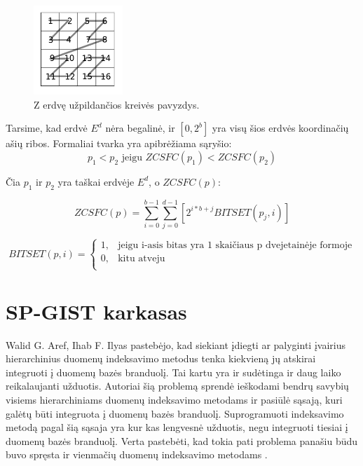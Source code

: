 \begin{figure}[H]
\begin{center}
\includegraphics[width=0.3\textwidth]{img/ZCurveSpaceFillingCurve.png}
\caption{Z erdvę užpildančios kreivės pavyzdys.}
\label{img:ZCurveSpaceFillingCurve}
\end{center}
\end{figure}

Tarsime, kad erdvė $E^d$ nėra begalinė, ir $[0, 2^b]$ yra visų šios erdvės koordinačių ašių ribos.
Formaliai tvarka yra apibrėžiama sąryšio:
\begin{equation}
	p_1 < p_2 \text{ jeigu } ZCSFC(p_1) < ZCSFC(p_2)
\label{eq:ZCurveSFCComparison}
\end{equation}

Čia $p_1$ ir $p_2$ yra taškai erdvėje $E^d$, o $ZCSFC(p)$:

\begin{equation}
	ZCSFC(p) = \sum_{i=0}^{b-1} \sum_{j=0}^{d-1} [2^{i*b+j} BITSET(p_j, i)]
\label{eq:ZCurveSFCValue}
\end{equation}


\begin{equation}
	BITSET(p, i)=
\begin{cases}
	1,& \text{jeigu } \text{i-asis bitas yra 1 skaičiaus p dvejetainėje formoje}\\
	0,& \text{kitu atveju}\\
\end{cases}
\label{eq:Bitset}
\end{equation}






\section{SP-GIST karkasas}

Walid G. Aref, Ihab F. Ilyas \cite{aref2001sp} pastebėjo, kad siekiant įdiegti ar palyginti įvairius hierarchinius duomenų indeksavimo metodus tenka kiekvieną jų atskirai integruoti į duomenų bazės branduolį.
Tai kartu yra ir sudėtinga ir daug laiko reikalaujanti užduotis.
Autoriai šią problemą sprendė ieškodami bendrų savybių visiems hierarchiniams duomenų indeksavimo metodams ir pasiūlė sąsają, kuri galėtų būti integruota į duomenų bazės branduolį.
Suprogramuoti indeksavimo metodą pagal šią sąsaja yra kur kas lengvesnė užduotis, negu integruoti tiesiai į duomenų bazės branduolį.
Verta pastebėti, kad tokia pati problema panašiu būdu buvo spręsta ir vienmačių duomenų indeksavimo metodams \cite{hellerstein1995generalized}.

